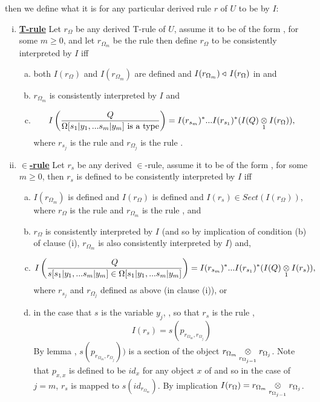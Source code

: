 \begin{numbereddefinition}
\IfIpartialmappingUtoCw
then we define what it is for any particular derived rule $r$ of $U$ to be  by $I$: \\
\begin{enumerate}[(i)]
\item \underline{\textbf{T-rule}} 
Let $r_\Omega$ be any  derived T-rule of $U$, assume it to be of the form \ZOmega, for some $m \geq 0$, 
and let $r_{\Omega_m}$ be the rule 
then define $r_\Omega$ to be consistently interpreted by $I$ iff
\begin{enumerate}[(a)] 
\item both $I(r_\Omega)$ and $I(r_{\Omega_m})$ are defined and $I(r_{\Omega_m}) \base\, I(r_\Omega)$ in \catcw and 
\item $r_{\Omega_m}$ is consistently interpreted by $I$  and
\item 
\smMappedToCacscade
$$ \Imappedrule{Q}{\isT{\Omega[\SUBsFORy{m}]}} 
= I(r_{s_m})^*...I(r_{s_1})^*(\crossx{I(Q)}{I(r_\Omega)}{1}),$$
where $r_{s_j}$ is the rule  
and $r_{\Omega_j}$ is the rule .
\end {enumerate}
\item \underline{\textbf{$\in$-rule}} 
Let $r_s$ be any derived $\in$-rule, assume it to be of the form \ZsOmega, for some $m \geq 0$, then
$r_s$ is defined to be consistently interpreted by $I$ 
iff  
\begin{enumerate}[(a)]
\item $I(r_{\Omega_m})$ is defined and $I(r_\Omega)$ is defined and $\displaystyle I(r_s) \in Sect(I(r_\Omega))$, where
$r_\Omega$ is the rule \ZOmega and $r_{\Omega_m}$ is the rule , and
\item
$r_{\Omega}$ is consistently interpreted by $I$ (and so by implication of condition (b) of clause (i),  $r_{\Omega_m}$ is also consistently interpreted by $I$) and,
\item  
\smMappedToCacscade
$$ \Imappedrule{Q}{\ofT{s[\SUBsFORy{m}]}{\Omega[\SUBsFORy{m}]}} = I(r_{s_m})^*...I(r_{s_1})^*(\crossx{I(Q)}{I(r_s)}{1}),$$
where $r_{s_j}$ and $r_{\Omega_j}$ defined as above (in clause (i)), or
\item in the case that $s$ is the variable $y_j$, \forsomej, so that $r_s$ is the rule ,
$$I(r_s) = s(p_{r_{\Omega_m},r_{\Omega_j}})$$
By lemma , $s(p_{r_{\Omega_m},r_{\Omega_j}}))$ is a section of the object $\crossx{r_{\Omega_m}}{r_{\Omega_j}}{r_{\Omega_{j-1}}}$.
Note that $p_{x,x}$ is defined to be $id_{x}$ for any object $x$ of \catcw and so in the case of $j=m$, $r_s$
is mapped to   $s(id_{r_{\Omega_m}})$.
By implication $I(r_\Omega)=\crossx{r_{\Omega_m}}{r_{\Omega_j}}{r_{\Omega_{j-1}}}$. 
\end{enumerate}


\end{enumerate}
\end{numbereddefinition}
